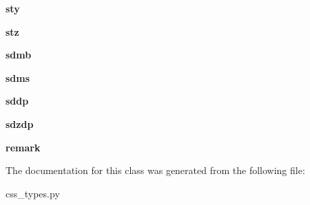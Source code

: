 \begin{DoxyCompactItemize}
\item 
\hypertarget{classcss__types_1_1origerr28_a4323130c699ec907427a8b56bd626547}{}{\bfseries sty}\label{classcss__types_1_1origerr28_a4323130c699ec907427a8b56bd626547}

\item 
\hypertarget{classcss__types_1_1origerr28_a309ff346e1fd9d4ac76f5ceac3685567}{}{\bfseries stz}\label{classcss__types_1_1origerr28_a309ff346e1fd9d4ac76f5ceac3685567}

\item 
\hypertarget{classcss__types_1_1origerr28_a78b2363e2bbabc90ad9349fb2c0179b0}{}{\bfseries sdmb}\label{classcss__types_1_1origerr28_a78b2363e2bbabc90ad9349fb2c0179b0}

\item 
\hypertarget{classcss__types_1_1origerr28_a911337aea61644f5b6abc8afebf4c3a0}{}{\bfseries sdms}\label{classcss__types_1_1origerr28_a911337aea61644f5b6abc8afebf4c3a0}

\item 
\hypertarget{classcss__types_1_1origerr28_a9973ac6aad0df442b9807997276c0e12}{}{\bfseries sddp}\label{classcss__types_1_1origerr28_a9973ac6aad0df442b9807997276c0e12}

\item 
\hypertarget{classcss__types_1_1origerr28_a12273934a3ad97293fc91062d2d23d7e}{}{\bfseries sdzdp}\label{classcss__types_1_1origerr28_a12273934a3ad97293fc91062d2d23d7e}

\item 
\hypertarget{classcss__types_1_1origerr28_aa0a297ae2e7523a3040c3f427505f79d}{}{\bfseries remark}\label{classcss__types_1_1origerr28_aa0a297ae2e7523a3040c3f427505f79d}

\end{DoxyCompactItemize}


The documentation for this class was generated from the following file\+:\begin{DoxyCompactItemize}
\item 
css\+\_\+types.\+py\end{DoxyCompactItemize}
